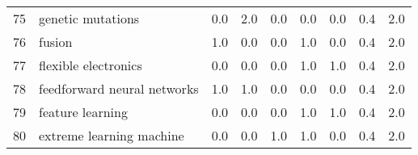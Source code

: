 \begin{tabular}{llrrrrrrr}
75 &                  genetic mutations &   0.0 &   2.0 &   0.0 &   0.0 &   0.0 &   0.4 &    2.0 \\
76 &                             fusion &   1.0 &   0.0 &   0.0 &   1.0 &   0.0 &   0.4 &    2.0 \\
77 &               flexible electronics &   0.0 &   0.0 &   0.0 &   1.0 &   1.0 &   0.4 &    2.0 \\
78 &        feedforward neural networks &   1.0 &   1.0 &   0.0 &   0.0 &   0.0 &   0.4 &    2.0 \\
79 &                   feature learning &   0.0 &   0.0 &   0.0 &   1.0 &   1.0 &   0.4 &    2.0 \\
80 &           extreme learning machine &   0.0 &   0.0 &   1.0 &   1.0 &   0.0 &   0.4 &    2.0 \\
\bottomrule
\end{tabular}
